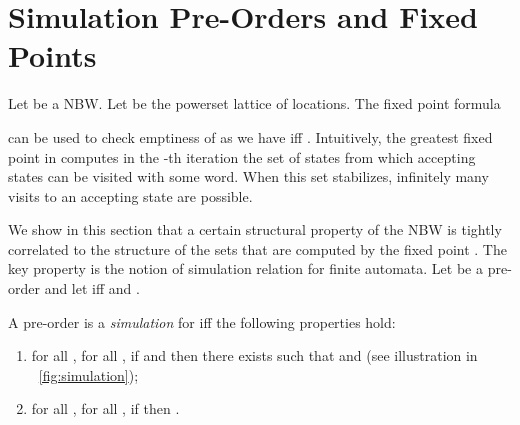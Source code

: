 \documentclass{LMCS}
\begin{document}
\section{Simulation Pre-Orders and Fixed Points}\label{sec:fixed-point}

Let  be a NBW.  Let
 be the
powerset lattice of locations. The fixed point formula

can be used to check emptiness of  as we have  iff .
Intuitively, the greatest fixed point  in  computes in the
-th iteration the set of states from which  accepting states can be visited
with some word. When this set stabilizes, infinitely many visits to an accepting
state are possible.


We show in this section that a certain structural property of the NBW
is tightly correlated to the structure of the sets that are computed by the 
fixed point . The key property is the notion of simulation relation
for finite automata. Let  be a pre-order and let  iff  and .

\begin{defi}\label{def:simulation}
  A pre-order  is a \emph{simulation} for  iff the following
  properties hold:
  \begin{enumerate}[]
    
    \item for all , for all , if
     and  then there exists
     such that  and  (see illustration in \figurename~\ref{fig:simulation});

    \item for all , for all , if  
     then .

  \end{enumerate}
\end{defi}
\end{document}
